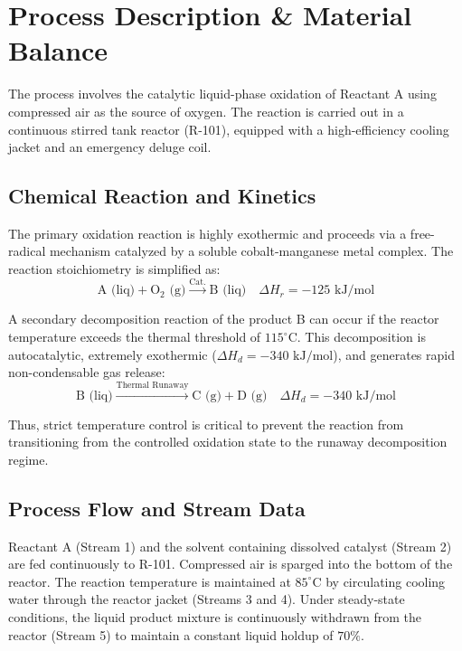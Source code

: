 \section{Process Description \& Material Balance}
\label{sec:process_desc}

The process involves the catalytic liquid-phase oxidation of Reactant A using compressed air as the source of oxygen. The reaction is carried out in a continuous stirred tank reactor (R-101), equipped with a high-efficiency cooling jacket and an emergency deluge coil.

\subsection{Chemical Reaction and Kinetics}
The primary oxidation reaction is highly exothermic and proceeds via a free-radical mechanism catalyzed by a soluble cobalt-manganese metal complex. The reaction stoichiometry is simplified as:
\begin{equation}
\text{A (liq)} + \text{O}_2\text{ (g)} \xrightarrow{\text{Cat.}} \text{B (liq)} \quad \Delta H_r = -125 \text{ kJ/mol}
\end{equation}

A secondary decomposition reaction of the product B can occur if the reactor temperature exceeds the thermal threshold of $115^\circ\text{C}$. This decomposition is autocatalytic, extremely exothermic ($\Delta H_d = -340 \text{ kJ/mol}$), and generates rapid non-condensable gas release:
\begin{equation}
\text{B (liq)} \xrightarrow{\text{Thermal Runaway}} \text{C (g)} + \text{D (g)} \quad \Delta H_d = -340 \text{ kJ/mol}
\end{equation}

Thus, strict temperature control is critical to prevent the reaction from transitioning from the controlled oxidation state to the runaway decomposition regime.

\subsection{Process Flow and Stream Data}
Reactant A (Stream 1) and the solvent containing dissolved catalyst (Stream 2) are fed continuously to R-101. Compressed air is sparged into the bottom of the reactor. The reaction temperature is maintained at $85^\circ\text{C}$ by circulating cooling water through the reactor jacket (Streams 3 and 4). Under steady-state conditions, the liquid product mixture is continuously withdrawn from the reactor (Stream 5) to maintain a constant liquid holdup of $70\%$.

